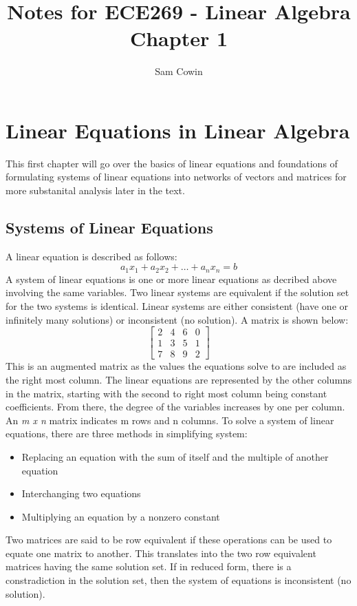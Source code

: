 \documentclass[12pt]{article}
\begin{document}
\title{Notes for ECE269 - Linear Algebra \\
\large Chapter 1}
\author{Sam Cowin}

\maketitle

\section{Linear Equations in Linear Algebra}
This first chapter will go over the basics of linear equations and foundations of formulating systems of linear equations %
into networks of vectors and matrices for more substanital analysis later in the text.

\subsection{Systems of Linear Equations}
A linear equation is described as follows:
\begin{equation}
    a_1x_1 + a_2x_2 + \dots + a_nx_n = b
\end{equation}
A system of linear equations is one or more linear equations as decribed above involving the same variables. %
Two linear systems are equivalent if the solution set for the two systems is identical. Linear systems are either %
consistent (have one or infinitely many solutions) or inconsistent (no solution).
\newline
\newline
\noindent A matrix is shown below:
$$
\begin{bmatrix}
    2 & 4 & 6 & 0 \\
    1 & 3 & 5 & 1 \\
    7 & 8 & 9 & 2
\end{bmatrix}
$$
\newline
This is an augmented matrix as the values the equations solve to are included as the right most column. The linear equations are represented%
 by the other columns in the matrix, starting with the second to right most column being constant coefficients. From there, the degree of the variables%
 increases by one per column. An \textit{m x n} matrix indicates m rows and n columns. 
\newline
\newline
To solve a system of linear equations, there are three methods in simplifying system:
\begin{itemize}
    \item Replacing an equation with the sum of itself and the multiple of another equation
    \item Interchanging two equations
    \item Multiplying an equation by a nonzero constant
\end{itemize}
Two matrices are said to be row equivalent if these operations can be used to equate one matrix to another. This translates into the two row equivalent matrices %
having the same solution set. If in reduced form, there is a constradiction in the solution set, then the system of equations is inconsistent (no solution). 
\newline
\newline
\end{document}
